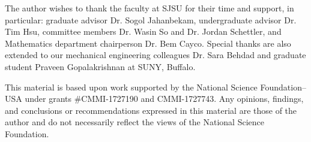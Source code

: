 The author wishes to thank the faculty at SJSU for their time and support, in particular: graduate advisor
Dr. Sogol Jahanbekam, undergraduate advisor Dr. Tim Hsu, committee members Dr. Wasin So and Dr. Jordan Schettler,
and Mathematics department chairperson Dr. Bem Cayco.  Special thanks are also extended to our mechanical
engineering colleagues Dr. Sara Behdad and graduate student Praveen Gopalakrishnan at SUNY, Buffalo.

This material is based upon work supported by the National Science Foundation–USA under grants \#CMMI-1727190 and
CMMI-1727743. Any opinions, findings, and conclusions or recommendations expressed in this material are those of
the author and do not necessarily reflect the views of the National Science Foundation.
